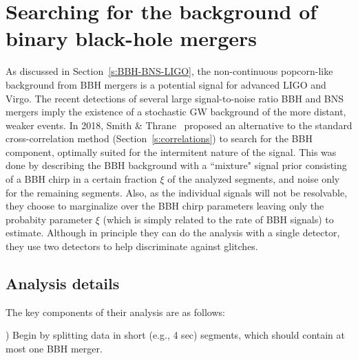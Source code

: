 \section{Searching for the background of binary black-hole
mergers}
\label{s:nonstationary}

As discussed in Section~\ref{s:BBH-BNS-LIGO}, the non-continuous 
popcorn-like background from BBH mergers is a potential signal 
for advanced LIGO and Virgo.
The recent detections of several large signal-to-noise ratio
BBH and BNS mergers imply the existence of a stochastic GW 
background of the more distant, weaker events.
In 2018, Smith \& Thrane~\cite{Smith-Thrane:2018} 
proposed an alternative to the standard cross-correlation 
method (Section~\ref{s:correlations})
to search for the BBH component, optimally suited for the 
intermitent nature of the signal.
This was done by describing the BBH 
background with a ``mixture" signal prior consisting of
a BBH chirp in a certain fraction $\xi$ of the analyzed 
segments, and noise only for the remaining segments.
Also, as the individual signals will not be resolvable, they 
choose to marginalize over the BBH chirp parameters 
leaving only the probabity parameter $\xi$ (which is 
simply related to the rate of BBH signals) to estimate.
Although in principle they can do the analysis with a
single detector, they use two detectors to help 
discriminate against glitches.

\subsection{Analysis details}

The key components of their analysis are as follows:
\smallskip

) Begin by splitting data in short (e.g., 4 sec) segments, 
which should contain at most one BBH merger.


